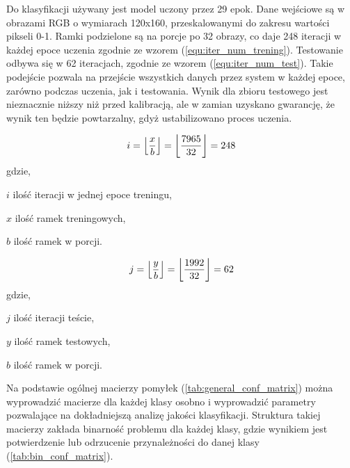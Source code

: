{\parindent0pt
Do klasyfikacji używany jest model uczony przez 29 epok. Dane wejściowe są w obrazami RGB o wymiarach 120x160, przeskalowanymi do zakresu wartości pikseli 0-1. Ramki podzielone są na porcje po 32 obrazy, co daje 248 iteracji w każdej epoce uczenia zgodnie ze wzorem (\ref{equ:iter_num_trening}). Testowanie odbywa się w 62 iteracjach, zgodnie ze wzorem (\ref{equ:iter_num_test}). Takie podejście pozwala na przejście wszystkich danych przez system w każdej epoce, zarówno podczas uczenia, jak i testowania. Wynik dla zbioru testowego jest nieznacznie niższy niż przed kalibracją, ale w zamian uzyskano gwarancję, że wynik ten będzie powtarzalny, gdyż ustabilizowano proces uczenia. 

\begin{equation}
i = \floor*{\frac{x}{b}} = \floor*{\frac{7965}{32}} = 248
\label{equ:iter_num_trening}
\end{equation}
gdzie,
\begin{eqwhere}[2cm]
	\item[$i$] ilość iteracji w jednej epoce treningu,
	\item[$x$] ilość ramek treningowych,
	\item[$b$] ilość ramek w porcji.
\end{eqwhere}

\begin{equation}
j = \floor*{\frac{y}{b}} = \floor*{\frac{1992}{32}} = 62
\label{equ:iter_num_test}
\end{equation}
gdzie,
\begin{eqwhere}[2cm]
	\item[$j$] ilość iteracji teście,
	\item[$y$] ilość ramek testowych,
	\item[$b$] ilość ramek w porcji.
\end{eqwhere}

Na podstawie ogólnej macierzy pomyłek (\ref{tab:general_conf_matrix}) można wyprowadzić macierze dla każdej klasy osobno i wyprowadzić parametry pozwalające na dokładniejszą analizę jakości klasyfikacji. Struktura takiej macierzy zakłada binarność problemu dla każdej klasy, gdzie wynikiem jest potwierdzenie lub odrzucenie przynależności do danej klasy (\ref{tab:bin_conf_matrix}).

}
